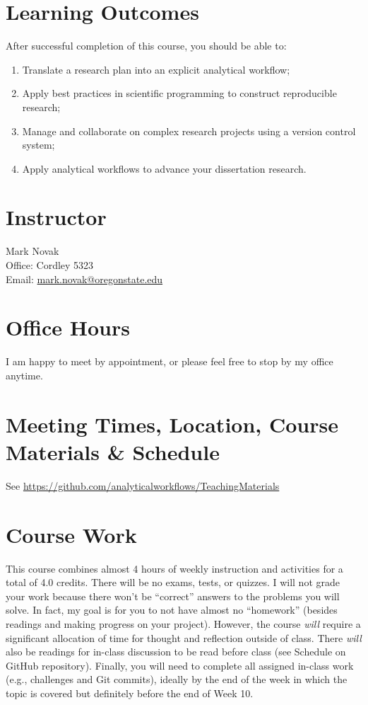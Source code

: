 \documentclass[10pt]{article}
\begin{document}
\section*{Learning Outcomes}
\noindent
After successful completion of this course, you should be able to:
\begin{enumerate}
	\itemsep0em
	\item Translate a research plan into an explicit analytical workflow;
	\item Apply best practices in scientific programming to construct reproducible research;
	\item Manage and collaborate on complex research projects using a version control system;
	\item Apply analytical workflows to advance your dissertation research.
\end{enumerate}

\section*{Instructor}
	\noindent
	Mark Novak\\
	Office: Cordley 5323\\
	Email: \href{mailto:mark.novak@oregonstate.edu}{mark.novak@oregonstate.edu}\\


\section*{Office Hours}
\noindent
	I am happy to meet by appointment, or please feel free to stop by my office 
	anytime.

\section*{Meeting Times, Location, Course Materials \& Schedule}
\noindent
See
\href{https://github.com/analyticalworkflows/TeachingMaterials}{https://github.com/analyticalworkflows/TeachingMaterials}
 


\section*{Course Work}
This course combines almost 4 hours of weekly instruction and activities for a total of 4.0 credits.
There will be no exams, tests, or quizzes.
I will not grade your work because there won't be ``correct'' answers to the 
problems you will solve.
In fact, my goal is for you to not have almost no ``homework'' (besides readings 
and making progress on your project).
However, the course \textit{will} require a significant allocation of time for 
thought and reflection outside of class.
There \textit{will} also be readings for in-class discussion to be read before class (see Schedule on GitHub repository).
Finally, you will need to complete all assigned in-class work (e.g., challenges 
and Git commits), ideally by the end of the week in which the topic is covered 
but definitely before the end of Week 10.
\end{document}
